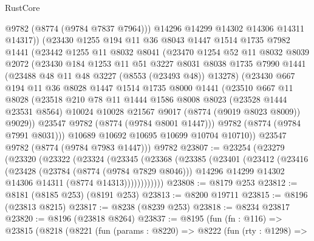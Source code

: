 \begin{lexlean}{RustCore}
\begin{coremodule}
          @9782
          (@8774 (@9784 @7837 @7964)))
        @14296
        @14299
        @14302
        @14306
        @14311
        @14317))
    (@23430
      @1255
      @194
      @11
      @36
      @8043
      @1447
      @1514
      @1735
      @7982
      @1441
      (@23442
        @1255
        @11
        @8032
        @8041
        (@23470
          @1254
          @52
          @11
          @8032
          @8039
          @2072
          (@23430
            @184
            @1253
            @11
            @51
            @3227
            @8031
            @8038
            @1735
            @7990
            @1441
            (@23488 @48 @11 @48 @3227 (@8553 (@23493 @48)) @13278)
            (@23430
              @667
              @194
              @11
              @36
              @8028
              @1447
              @1514
              @1735
              @8000
              @1441
              (@23510
                @667
                @11
                @8028
                (@23518
                  @210
                  @78
                  @11
                  @1444
                  @1586
                  @8008
                  @8023
                  (@23528 @1444 @23531 @8564)
                  @10024
                  @10028
                  @21567
                  @9017
                  (@8774 (@9019 @8023 @8009))
                  @9029))
              @23547
              @9782
              (@8774 (@9784 @8001 @1447)))
            @9782
            (@8774 (@9784 @7991 @8031)))
          @10689
          @10692
          @10695
          @10699
          @10704
          @10710))
      @23547
      @9782
      (@8774 (@9784 @7983 @1447)))
    @9782
@23807 := @23254
    (@23279
      (@23320
        (@23322
          (@23324
            (@23345
              (@23368
                (@23385
                  (@23401
                    (@23412
                      (@23416
                        (@23428
                          (@23784 (@8774 (@9784 @7829 @8046)))
                          @14296
                          @14299
                          @14302
                          @14306
                          @14311
                          (@8774 @14313))))))))))))
@23808 := @8179 @253
@23812 := @8181 (@8185 @253) (@8191 @253)
@23813 := @8200 @19711
@23815 := @8196 (@23813 @8215)
@23817 := @8238 (@8239 @253)
@23818 := @8234 @23817
@23820 := @8196 (@23818 @8264)
@23837 := @8195
    (fun (fn : @116) =>
    @23815
      (@8218
        (@8221
          (fun (params : @8220) =>
          @8222
            (fun (rty : @1298) =>

\end{coremodule}
\end{lexlean}
